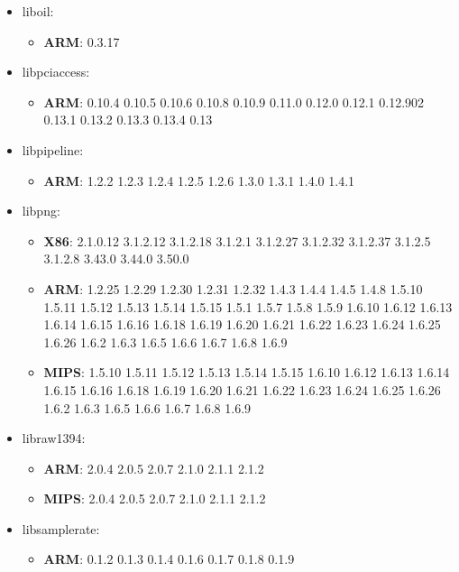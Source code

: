 \documentclass[twocolumn,a4paper]{IEEEtran} %
\begin{document}
\begin{itemize}[noitemsep,topsep=0pt,parsep=0pt,partopsep=0pt]
\item liboil:
\begin{itemize}[noitemsep,topsep=0pt,parsep=0pt,partopsep=0pt]
  \item \textbf{ARM}: 0.3.17
\end{itemize}

\item libpciaccess:
\begin{itemize}[noitemsep,topsep=0pt,parsep=0pt,partopsep=0pt]
  \item \textbf{ARM}: 0.10.4 0.10.5 0.10.6 0.10.8 0.10.9 0.11.0 0.12.0 0.12.1 0.12.902 0.13.1 0.13.2 0.13.3 0.13.4 0.13
\end{itemize}

\item libpipeline:
\begin{itemize}[noitemsep,topsep=0pt,parsep=0pt,partopsep=0pt]
  \item \textbf{ARM}: 1.2.2 1.2.3 1.2.4 1.2.5 1.2.6 1.3.0 1.3.1 1.4.0 1.4.1
\end{itemize}

\item libpng:
\begin{itemize}[noitemsep,topsep=0pt,parsep=0pt,partopsep=0pt]
  \item \textbf{X86}: 2.1.0.12 3.1.2.12 3.1.2.18 3.1.2.1 3.1.2.27 3.1.2.32 3.1.2.37 3.1.2.5 3.1.2.8 3.43.0 3.44.0 3.50.0
  \item \textbf{ARM}: 1.2.25 1.2.29 1.2.30 1.2.31 1.2.32 1.4.3 1.4.4 1.4.5 1.4.8 1.5.10 1.5.11 1.5.12 1.5.13 1.5.14 1.5.15 1.5.1 1.5.7 1.5.8 1.5.9 1.6.10 1.6.12 1.6.13 1.6.14 1.6.15 1.6.16 1.6.18 1.6.19 1.6.20 1.6.21 1.6.22 1.6.23 1.6.24 1.6.25 1.6.26 1.6.2 1.6.3 1.6.5 1.6.6 1.6.7 1.6.8 1.6.9
  \item \textbf{MIPS}: 1.5.10 1.5.11 1.5.12 1.5.13 1.5.14 1.5.15 1.6.10 1.6.12 1.6.13 1.6.14 1.6.15 1.6.16 1.6.18 1.6.19 1.6.20 1.6.21 1.6.22 1.6.23 1.6.24 1.6.25 1.6.26 1.6.2 1.6.3 1.6.5 1.6.6 1.6.7 1.6.8 1.6.9
\end{itemize}

\item libraw1394:
\begin{itemize}[noitemsep,topsep=0pt,parsep=0pt,partopsep=0pt]
  \item \textbf{ARM}: 2.0.4 2.0.5 2.0.7 2.1.0 2.1.1 2.1.2
  \item \textbf{MIPS}: 2.0.4 2.0.5 2.0.7 2.1.0 2.1.1 2.1.2
\end{itemize}

\item libsamplerate:
\begin{itemize}[noitemsep,topsep=0pt,parsep=0pt,partopsep=0pt]
  \item \textbf{ARM}: 0.1.2 0.1.3 0.1.4 0.1.6 0.1.7 0.1.8 0.1.9
\end{itemize}


\end{itemize}
\end{document}

